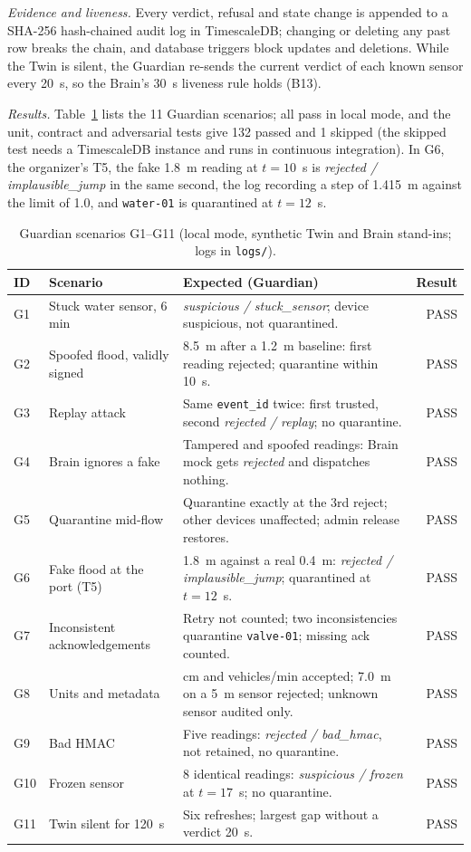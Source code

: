\documentclass[conference]{IEEEtran}
\newcommand{\code}[1]{\texttt{\small #1}}
\begin{document}
\emph{Evidence and liveness.} Every verdict, refusal and state change is appended to a SHA-256 hash-chained audit log in
TimescaleDB; changing or deleting any past row breaks the chain, and database triggers block updates and deletions. While the
Twin is silent, the Guardian re-sends the current verdict of each known sensor every 20~s, so the Brain's 30~s liveness rule
holds (B13).

\emph{Results.} Table~\ref{tab:gscen} lists the 11 Guardian scenarios; all pass in local mode, and the unit, contract and
adversarial tests give 132 passed and 1 skipped (the skipped test needs a TimescaleDB instance and runs in continuous
integration). In G6, the organizer's T5, the fake 1.8~m reading at $t=10$~s is \emph{rejected / implausible\_jump} in the same
second, the log recording a step of 1.415~m against the limit of 1.0, and \code{water-01} is quarantined at $t=12$~s.

\begin{table}[t]
\centering
\caption{Guardian scenarios G1--G11 (local mode, synthetic Twin and Brain stand-ins; logs in \texttt{logs/}).}
\label{tab:gscen}
\footnotesize
\renewcommand{\arraystretch}{1.05}
\begin{tabular}{@{}l p{4.2cm} p{10.4cm} r@{}}
\toprule
\textbf{ID} & \textbf{Scenario} & \textbf{Expected (Guardian)} & \textbf{Result}\\
\midrule
G1 & Stuck water sensor, 6 min & \emph{suspicious / stuck\_sensor}; device suspicious, not quarantined. & PASS\\
G2 & Spoofed flood, validly signed & 8.5~m after a 1.2~m baseline: first reading rejected; quarantine within 10~s. & PASS\\
G3 & Replay attack & Same \code{event\_id} twice: first trusted, second \emph{rejected / replay}; no quarantine. & PASS\\
G4 & Brain ignores a fake & Tampered and spoofed readings: Brain mock gets \emph{rejected} and dispatches nothing. & PASS\\
G5 & Quarantine mid-flow & Quarantine exactly at the 3rd reject; other devices unaffected; admin release restores. & PASS\\
G6 & Fake flood at the port (T5) & 1.8~m against a real 0.4~m: \emph{rejected / implausible\_jump}; quarantined at $t=12$~s. & PASS\\
G7 & Inconsistent acknowledgements & Retry not counted; two inconsistencies quarantine \code{valve-01}; missing ack counted. & PASS\\
G8 & Units and metadata & cm and vehicles/min accepted; 7.0~m on a 5~m sensor rejected; unknown sensor audited only. & PASS\\
G9 & Bad HMAC & Five readings: \emph{rejected / bad\_hmac}, not retained, no quarantine. & PASS\\
G10 & Frozen sensor & 8 identical readings: \emph{suspicious / frozen} at $t=17$~s; no quarantine. & PASS\\
G11 & Twin silent for 120~s & Six refreshes; largest gap without a verdict 20~s. & PASS\\
\bottomrule
\end{tabular}
\end{table}
\end{document}
